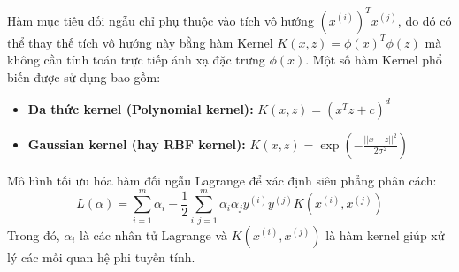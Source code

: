 Hàm mục tiêu đối ngẫu chỉ phụ thuộc vào tích vô hướng $(x^{(i)})^{T}x^{(j)}$, do đó có thể thay thế tích vô hướng này bằng hàm Kernel $K(x, z) = \phi(x)^T \phi(z)$ mà không cần tính toán trực tiếp ánh xạ đặc trưng $\phi(x)$. Một số hàm Kernel phổ biến được sử dụng bao gồm:
\begin{itemize}
    \item \textbf{Đa thức kernel (Polynomial kernel):} $K(x, z)=(x^{T}z+c)^{d}$
    \item \textbf{Gaussian kernel (hay RBF kernel):} $K(x, z)=\exp\left(-\frac{||x-z||^{2}}{2\sigma^{2}}\right)$
\end{itemize}
Mô hình tối ưu hóa hàm đối ngẫu Lagrange để xác định siêu phẳng phân cách:
\begin{equation}
L(\alpha) = \sum_{i=1}^{m} \alpha_i - \frac{1}{2} \sum_{i,j=1}^{m} \alpha_i \alpha_j y^{(i)} y^{(j)} K(x^{(i)}, x^{(j)})
\end{equation}
Trong đó, $\alpha_i$ là các nhân tử Lagrange và $K(x^{(i)}, x^{(j)})$ là hàm kernel giúp xử lý các mối quan hệ phi tuyến tính.






